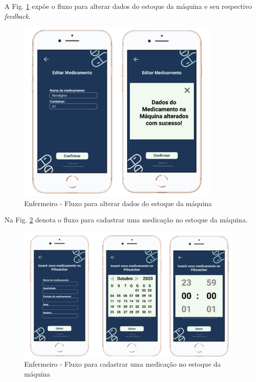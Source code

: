 A Fig. \ref{fig:prototipo_enfermeiro_gerenciarEstoqueMaquina_3} expõe o fluxo para alterar dados do estoque da máquina e seu respectivo \textit{feedback}.

\begin{figure}[H]
    \centering
      \includegraphics[width=10cm]{figuras/software/Atual_prototipo/Enfermeiro_gerenciarEstoqueMaquina_3.png}
    \caption{Enfermeiro - Fluxo para alterar dados do estoque da máquina}
    \label{fig:prototipo_enfermeiro_gerenciarEstoqueMaquina_3}
\end{figure}

Na Fig. \ref{fig:prototipo_enfermeiro_gerenciarEstoqueMaquina_4} denota o fluxo para cadastrar uma medicação no estoque da máquina.

\begin{figure}[H]
    \centering
      \includegraphics[width=15cm]{figuras/software/Atual_prototipo/Enfermeiro_gerenciarEstoqueMaquina_4.png}
    \caption{Enfermeiro - Fluxo para cadastrar uma medicação no estoque da máquina}
    \label{fig:prototipo_enfermeiro_gerenciarEstoqueMaquina_4}
\end{figure}

